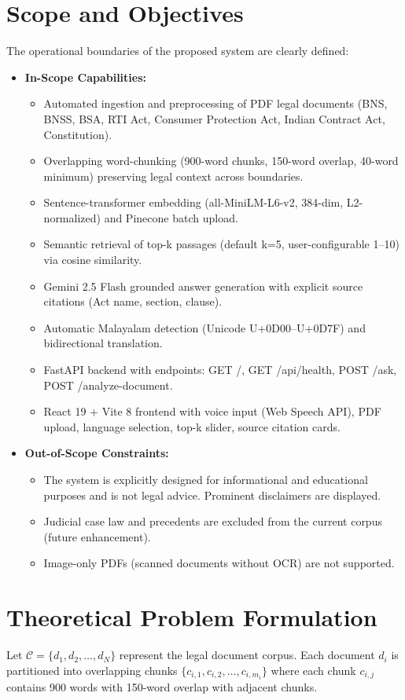 \documentclass[12pt,a4paper]{report}
\begin{document}
\section{Scope and Objectives}
The operational boundaries of the proposed system are clearly defined:
\begin{itemize}
    \item \textbf{In-Scope Capabilities:}
    \begin{itemize}
        \item Automated ingestion and preprocessing of PDF legal documents (BNS, BNSS, BSA, RTI Act, Consumer Protection Act, Indian Contract Act, Constitution).
        \item Overlapping word-chunking (900-word chunks, 150-word overlap, 40-word minimum) preserving legal context across boundaries.
        \item Sentence-transformer embedding (all-MiniLM-L6-v2, 384-dim, L2-normalized) and Pinecone batch upload.
        \item Semantic retrieval of top-k passages (default k=5, user-configurable 1–10) via cosine similarity.
        \item Gemini 2.5 Flash grounded answer generation with explicit source citations (Act name, section, clause).
        \item Automatic Malayalam detection (Unicode U+0D00–U+0D7F) and bidirectional translation.
        \item FastAPI backend with endpoints: GET /, GET /api/health, POST /ask, POST /analyze-document.
        \item React 19 + Vite 8 frontend with voice input (Web Speech API), PDF upload, language selection, top-k slider, source citation cards.
    \end{itemize}
    \item \textbf{Out-of-Scope Constraints:}
    \begin{itemize}
        \item The system is explicitly designed for informational and educational purposes and is not legal advice. Prominent disclaimers are displayed.
        \item Judicial case law and precedents are excluded from the current corpus (future enhancement).
        \item Image-only PDFs (scanned documents without OCR) are not supported.
    \end{itemize}
\end{itemize}

\section{Theoretical Problem Formulation}
Let $\mathcal{C} = \{d_1, d_2, \dots, d_N\}$ represent the legal document corpus. Each document $d_i$ is partitioned into overlapping chunks $\{c_{i,1}, c_{i,2}, \dots, c_{i,m_i}\}$ where each chunk $c_{i,j}$ contains 900 words with 150-word overlap with adjacent chunks.
\end{document}
